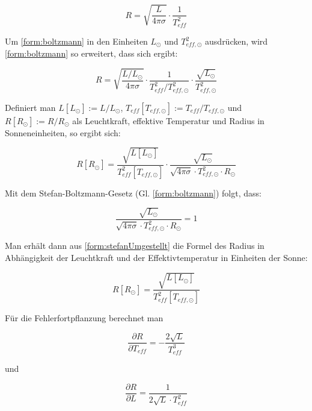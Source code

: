 \documentclass[titlepage]{scrartcl}
\begin{document}
\begin{equation}
R = \sqrt{\frac{L}{4 \pi \sigma}} \cdot \frac{1}{T_{eff}^2}
\label{form:boltzmann}
\end{equation}

Um \eqref{form:boltzmann} in den Einheiten $ L_{\odot} $ und $ T^2_{eff,\odot} $ ausdrücken, wird \eqref{form:boltzmann} so erweitert, dass sich ergibt:

\begin{equation}
R = \sqrt{\frac{L/L_{\odot}}{4 \pi \sigma}} \cdot \frac{1}{T^2_{eff}/T^2_{eff,\odot}} \cdot \frac{\sqrt{L_{\odot}}}{T^2_{eff,\odot}}
\end{equation}

Definiert man $ L[L_{\odot}] := L/L_{\odot} $, $ T_{eff}[T_{eff,\odot}] := T_{eff}/T_{eff,\odot} $ und $ R[R_{\odot}] := R/R_{\odot} $ als Leuchtkraft, effektive Temperatur und Radius in Sonneneinheiten, so ergibt sich:

\begin{equation}
R[R_{\odot}] = \frac{\sqrt{L[L_{\odot}]}}{T^2_{eff}[T_{eff,\odot}]} \cdot \frac{\sqrt{L_{\odot}}}{\sqrt{4 \pi \sigma} \cdot T^2_{eff,\odot} \cdot R_{\odot}}
\label{form:stefanUmgestellt}
\end{equation}

Mit dem Stefan-Boltzmann-Gesetz (Gl. \eqref{form:boltzmann}) folgt, dass:

\begin{equation}
\frac{\sqrt{L_{\odot}}}{\sqrt{4 \pi \sigma} \cdot T^2_{eff,\odot} \cdot R_{\odot}} = 1
\end{equation}

Man erhält dann aus \eqref{form:stefanUmgestellt} die Formel des Radius in Abhängigkeit der Leuchtkraft und der Effektivtemperatur in Einheiten der Sonne:

\begin{equation}
R[R_{\odot}] = \frac{\sqrt{L[L_{\odot}]}}{T^2_{eff}[T_{eff,\odot}]}
\end{equation}

\newpage

Für die Fehlerfortpflanzung berechnet man

\begin{equation}
\frac{\partial R}{\partial T_{eff}} = - \frac{2 \sqrt{L}}{T^3_{eff}}
\label{form:fehlerfortStefan1}
\end{equation}

und

\begin{equation}
\frac{\partial R}{\partial L} = \frac{1}{2 \sqrt{L} \cdot T^2_{eff}}
\label{form:fehlerfortStefan2}
\end{equation}
\end{document}
